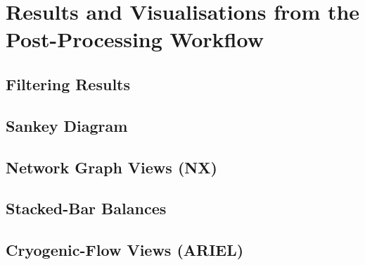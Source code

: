 \chapter{Results and Visualisations from the Post-Processing Workflow} \label{ch:chapter_07}

\section{Filtering Results}
\section{Sankey Diagram}
\section{Network Graph Views (NX)}
\section{Stacked-Bar Balances}
\section{Cryogenic-Flow Views (ARIEL)}
